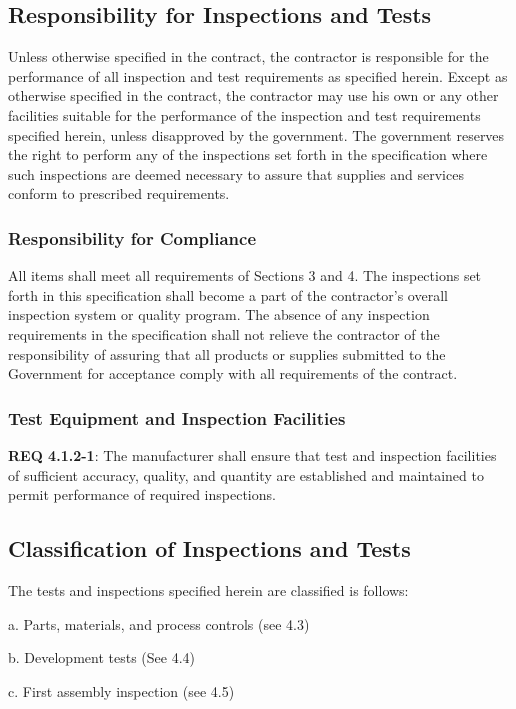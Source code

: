 \documentclass[12pt]{article}
\begin{document}
\subsection{Responsibility for Inspections and Tests} %
Unless otherwise specified in the contract, the contractor is responsible for the performance of all inspection and test requirements as specified herein. 
Except as otherwise specified in the contract, the contractor may use his own or any other facilities suitable for the performance of the inspection and test requirements specified herein, unless disapproved by the government. 
The government reserves the right to perform any of the inspections set forth in the specification where such inspections are deemed necessary to assure that supplies and services conform to prescribed requirements.

\subsubsection{Responsibility for Compliance} %
 All items shall meet all requirements of Sections 3 and 4.
The inspections set forth in this specification shall become a part of the contractor's overall inspection system or quality program. 
The absence of any inspection requirements in the specification shall not relieve the contractor of the responsibility of assuring that all products or supplies submitted to the Government for acceptance comply with all requirements of the contract.

\subsubsection{Test Equipment and Inspection Facilities} %
\noindent \textbf{REQ 4.1.2-1}: The manufacturer shall ensure that test and inspection facilities of sufficient accuracy, quality, and quantity are established and maintained to permit performance of required inspections.

\subsection{Classification of Inspections and Tests} %
The tests and inspections specified herein are classified is follows:

a. Parts, materials, and process controls (see 4.3) 

b. Development tests (See 4.4)

c. First assembly inspection (see 4.5)
\end{document}
